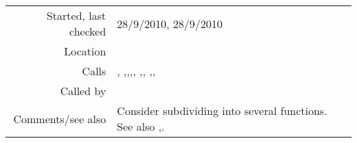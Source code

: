 \vspace{0.3cm}
\begin{tabular}{r|p{8cm}}
Started, last checked & 28/9/2010, 28/9/2010 \\
Location & \nameref{sec:generating-beat-MNN-spacing-forwards} \\
Calls & \nameref{fun:checklistp}, \nameref{fun:choose-one},\newline \nameref{fun:choose-one-with-beat},\newline \nameref{fun:geom-mean-likelihood-of-states},\newline \nameref{fun:index-1st-sublist-item>=}, \nameref{fun:my-last},\newline \nameref{fun:segments-strict}, \nameref{fun:sort-dataset-asc},\newline \nameref{fun:states2datapoints-by-lookup},\newline \nameref{fun:translate-datapoints-to-first-ontime} \\
Called by & \\
Comments/see also & Consider subdividing into several functions. See also \nameref{fun:generate-beat-MNN-spacing<-},\newline \nameref{fun:generate-beat-spacing-forcing->}. 
\end{tabular}

